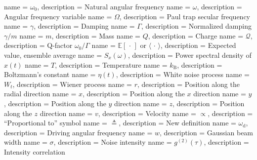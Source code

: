 {
        name = $\omega_0$,
        description = {Natural angular frequency}
}
{
        name = $\omega$,
        description = {Angular frequency variable}
}
{
        name = $\Omega$,
        description = {Paul trap secular frequency}
}
{
        name = $\gamma$,
        description = {Damping}
}
{
        name = $\Gamma$,
        description = {Normalized damping $\gamma/m$}
}
{
        name = $m$,
        description = {Mass}
}
{
        name = $Q$,
        description = {Charge}
}
{
        name = $\mathcal{Q}$,
        description = {Q-factor $\omega_0/\Gamma$}
}
{
        name = $\mathbb{E}[ \,\cdot \,] \textrm{ or } \langle \, \cdot \, \rangle$,
        description = {Expected value, ensemble average}
}
{
        name = $S_x(\omega)$,
        description = {Power spectral density of $x(t)$}
}
{
        name = $T$,
        description = {Temperature}
}
{
        name = $k_\textrm{B}$,
        description = {Boltzmann's constant}
}
{
        name = $\eta(t)$,
        description = {White noise process}
}
{
        name = $W_t$,
        description = {Wiener process}
}
{
        name = $r$,
        description = {Position along the radial direction}
}
{
        name = $x$,
        description = {Position along the $x$ direction}
}
{
        name = $y$,
        description = {Position along the $y$ direction}
}
{
        name = $z$,
        description = {Position along the $z$ direction}
}
{
        name = $v$,
        description = {Velocity}
}
{
        name = $\propto$,
        description = {``Proportional to'' symbol}
}
{
        name = $\triangleq$,
        description = {New definition}
}
{
        name = $\omega_\text{d}$,
        description = {Driving angular frequency}
}
{
        name = $w$,
        description = {Gaussian beam width}
}
{
        name = $\sigma$,
        description = {Noise intensity}
}
{
        name = $g^{(2)}(\tau)$,
        description = {Intensity correlation}
}
